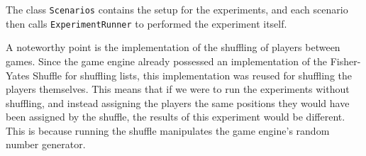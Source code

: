 The class \texttt{Scenarios} contains the setup for the experiments,
and each scenario then calls \texttt{ExperimentRunner} to performed
the experiment itself.

A noteworthy point is the implementation of the shuffling of players between games.
Since the game engine already possessed an implementation of the Fisher-Yates Shuffle
\cite{Knuth98} for shuffling lists, this implementation was reused for shuffling the
players themselves. This means that if we were to run the experiments
without shuffling, and instead assigning the players the same positions they would
have been assigned by the shuffle, the results of this experiment would be different.
This is because running the shuffle manipulates the game engine's random number generator.
